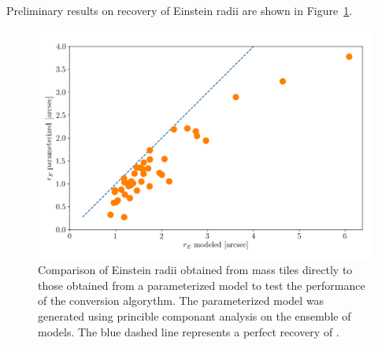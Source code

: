 Preliminary results on recovery of Einstein radii are shown in
Figure~\ref{fig:parameter}.

\begin{figure}
  \includegraphics[width=\linewidth]{img/rE_comp/rE_comp.png}
  \caption{
    Comparison of Einstein radii \ER obtained from mass tiles directly to those obtained from a parameterized model to test the performance of the conversion algorythm.
    The parameterized model was generated using princible componant analysis on the ensemble of models.
    The blue dashed line represents a perfect recovery of \ER.
    }
  \label{fig:parameter}
\end{figure}



